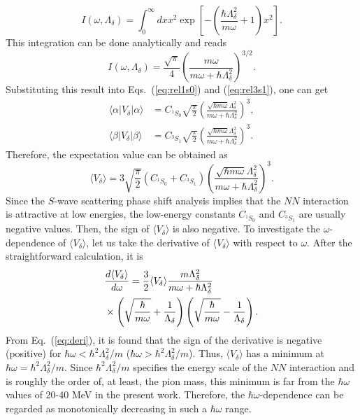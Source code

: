 \documentclass[aps,prc, dvips, twocolumn,groupedaddress,showkeys,showpacs,floatfix,superscriptaddress]{revtex4-1}
\newcommand{\<}{\langle}
\renewcommand{\>}{\rangle}
\begin{document}
 \begin{equation}
   I(\omega, \Lambda_{\delta}) =  \int^{\infty}_{0} dx x^{2} \exp \left[
     -  \left(\frac{\hbar \Lambda_{\delta}^{2}}{m\omega } + 1 \right)
   x^{2}\right].
 \end{equation}
This integration can be done analytically and reads
\begin{equation}
  I(\omega, \Lambda_{\delta}) = \frac{\sqrt{\pi}}{4} \left(
    \frac{m\omega}{m\omega + \hbar \Lambda_{\delta}^{2}}
  \right)^{3/2}.
\end{equation}
Substituting this result into Eqs.~(\ref{eq:rel1s0}) and (\ref{eq:rel3s1}),
one can get
\begin{align}
  \label{eq:rel1s0_2}
  \<\alpha|V_{\delta}|\alpha\> &= C_{^{1}S_{0}}\sqrt{\frac{\pi}{2}}
  \left(
    \frac{\sqrt{\hbar m\omega} \Lambda_{\delta}^{2}}
    {m\omega + \hbar\Lambda_{\delta}^{2}}
  \right)^{3}, \\
  \label{eq:rel1s0_2}
  \<\beta|V_{\delta}|\beta\> &= C_{^{3}S_{1}}\sqrt{\frac{\pi}{2}}
  \left(
    \frac{\sqrt{\hbar m\omega} \Lambda_{\delta}^{2}}
    {m\omega + \hbar\Lambda_{\delta}^{2}}
  \right)^{3}.
\end{align}
Therefore, the expectation value can be obtained as
\begin{equation}
   \<V_{\delta}\>
   =  3 \sqrt{\frac{\pi}{2}} (C_{^{1}S_{0}} + C_{^{3}S_{1}})
  \left(
    \frac{\sqrt{\hbar m\omega} \Lambda_{\delta}^{2}}
    {m\omega + \hbar\Lambda_{\delta}^{2}}
  \right)^{3}.
\end{equation}
Since the $S$-wave scattering phase shift analysis implies that the $NN$ interaction
is attractive at low energies,
the low-energy constants $C_{^{1}S_{0}}$ and $C_{^{3}S_{1}}$ are usually negative values.
Then, the sign of $\<V_{\delta}\>$ is also negative.
To investigate the $\omega$-dependence of $\<V_{\delta}\>$, let us take the
derivative of $\<V_{\delta}\>$ with respect to $\omega$.
After the straightforward calculation, it is
\begin{align}
  & \frac{d\<V_{\delta}\>}{d\omega}
  = \frac{3}{2} \<V_{\delta}\>
  \frac{m\Lambda_{\delta}^{2}}
  {m\omega + \hbar\Lambda_{\delta}^{2}}
  \notag \\
  \label{eq:deri}
  & \times
  \left(\sqrt{\frac{\hbar}{m\omega}} + \frac{1}{\Lambda_{\delta}}
  \right)
  \left(\sqrt{\frac{\hbar}{m\omega}} - \frac{1}{\Lambda_{\delta}}
  \right).
\end{align}
From Eq.~(\ref{eq:deri}),  it is found that
the sign of the derivative is negative (positive) for $\hbar\omega < \hbar^{2}\Lambda_{\delta}^{2} / m$
($\hbar\omega > \hbar^{2}\Lambda_{\delta}^{2} / m$).
Thus, $\<V_{\delta}\>$ has a minimum at $\hbar\omega = \hbar^{2}\Lambda^{2}_{\delta}/m$.
Since $\hbar^{2}\Lambda_{\delta}^{2}/m$ specifies the energy scale of the
$NN$ interaction and is roughly the order of, at least,
the pion mass, this minimum is far from the $\hbar\omega$ values of 20-40 MeV in the
 present work.
Therefore, the $\hbar\omega$-dependence can be regarded as
monotonically decreasing in such a $\hbar\omega$ range.
\end{document}
